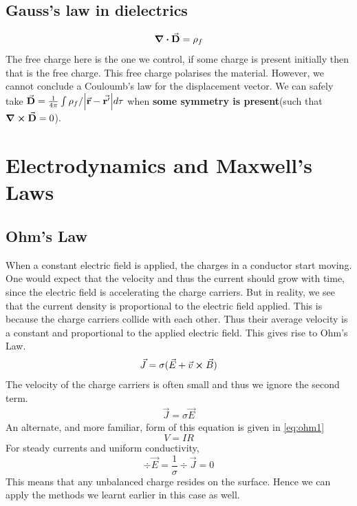 \documentclass[12pt, oneside]{book}
\begin{document}
\section{Gauss's law in dielectrics}
\begin{equation}
	\div{\va{D}}=\rho_f
\end{equation}
The free charge here is the one we control, if some charge is present initially then that is the free charge. This free charge polarises the material. However, we cannot conclude a Couloumb's law for the displacement vector. We can safely take $\va{D}=\tfrac{1}{4\pi}\int \rho_f/\abs{\va{r}-\va{r'}}d\tau$ when \textbf{some symmetry is present}(such that  $\curl{\va{D}}=0$). 


\chapter{Electrodynamics and Maxwell's Laws}
\section{Ohm's Law}
When a constant electric field is applied, the charges in a conductor start moving. One would expect that the velocity and thus the current should grow with time, since the electric field is accelerating the charge carriers. But in reality, we see that the current density is proportional to the electric field applied. This is because the charge carriers collide with each other. Thus their average velocity is a constant and proportional to the applied electric field. This gives rise to Ohm's Law. 
\begin{gather}
	\vec{J} = \sigma (\vec{E} + \vec{v} \cross \vec{B}) 
\end{gather}
The velocity of the charge carriers is often small and thus we ignore the second term.
\begin{gather}
	\vec{J} = \sigma \vec{E}
\end{gather}
An alternate, and more familiar, form of this equation is given in \eqref{eq:ohm1}
\begin{equation}
	V = IR
	\label{eq:ohm1}
\end{equation}
For steady currents and uniform conductivity,
\begin{equation}
		\div \vec E = \frac{1}{\sigma} \div \vec J = 0
\end{equation}
This means that any unbalanced charge resides on the surface. Hence we can apply the methods we learnt earlier in this case as well.
\end{document}
